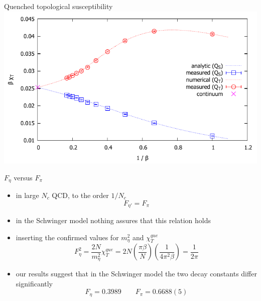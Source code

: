 \documentclass[english]{beamer}
\begin{document}
\begin{frame}{Quenched topological susceptibility}
  \includegraphics[width=1\textwidth]{figs/BeakDiagram}
\end{frame}

\begin{frame}{$F_\eta$ versus $F_\pi$}
  \begin{itemize}
    \item in large $N_c$ QCD, to the order $1/N_c$
      \[
        F_{\eta'} = F_\pi
      \]
    \item in the Schwinger model nothing assures that this relation 
      holds  \item inserting the confirmed values for $m_\eta^2$
      and $\chi_T^{que}$ 
      \[
        F_{\eta}^2 = \frac{2N}{m_\eta^2}\chi_T^{que} =
          2N \left(\frac{\pi\beta}{N}\right)
          \left(\frac{1}{4\pi^2\beta}\right) =
          \frac{1}{2\pi}
      \]
    \item our results suggest that in the Schwinger model the two
      decay constants differ significantly
      \[
        F_{\eta} = 0.3989 \qquad F_\pi = 0.6688(5)
      \]
  \end{itemize}
\end{frame}
\end{document}
